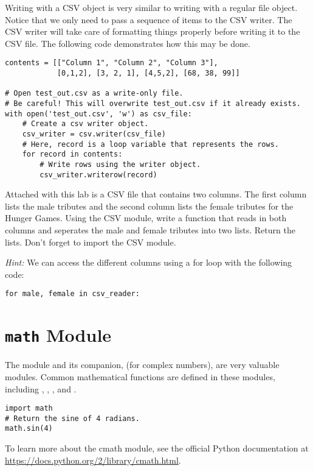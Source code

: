 Writing with a CSV  object is very similar to writing with a regular file object.  Notice that we only need to pass a sequence of items to the CSV writer.  The CSV writer will take care of formatting things properly before writing it to the CSV file.
The following code demonstrates how this may be done.
\begin{lstlisting}
contents = [["Column 1", "Column 2", "Column 3"],
            [0,1,2], [3, 2, 1], [4,5,2], [68, 38, 99]]

# Open test_out.csv as a write-only file.
# Be careful! This will overwrite test_out.csv if it already exists.
with open('test_out.csv', 'w') as csv_file:
    # Create a csv writer object.
    csv_writer = csv.writer(csv_file)
    # Here, record is a loop variable that represents the rows.
    for record in contents:
        # Write rows using the writer object.
        csv_writer.writerow(record)
\end{lstlisting}

\begin{problem}
Attached with this lab is a CSV file that contains two columns. The first column lists the male tributes and the second column lists the female tributes for the Hunger Games. Using the CSV module, write a function that reads in both columns and seperates the male and female tributes into two lists. Return the lists. Don't forget to import the CSV module.

\emph{Hint:} We can access the different columns using a for loop with the following code:
 
\begin{lstlisting}
for male, female in csv_reader:
\end{lstlisting}

\end{problem}

\section*{\texttt{math} Module}
The  module and its companion,  (for complex numbers), are very valuable modules.
Common mathematical functions are defined in these modules, including , , , and .

\begin{lstlisting}
import math
# Return the sine of 4 radians.
math.sin(4)
\end{lstlisting}

To learn more about the cmath module, see the official Python documentation at \url{https://docs.python.org/2/library/cmath.html}.

